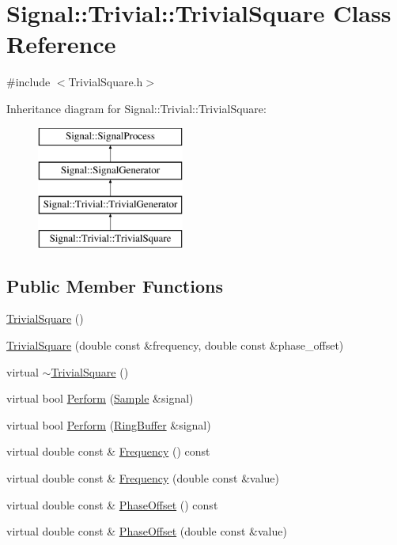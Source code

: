\hypertarget{classSignal_1_1Trivial_1_1TrivialSquare}{\section{Signal\+:\+:Trivial\+:\+:Trivial\+Square Class Reference}
\label{classSignal_1_1Trivial_1_1TrivialSquare}
}


{\ttfamily \#include $<$Trivial\+Square.\+h$>$}

Inheritance diagram for Signal\+:\+:Trivial\+:\+:Trivial\+Square\+:\begin{figure}[H]
\begin{center}
\leavevmode
\includegraphics[height=4.000000cm]{classSignal_1_1Trivial_1_1TrivialSquare}
\end{center}
\end{figure}
\subsection*{Public Member Functions}
\begin{DoxyCompactItemize}
\item 
\hyperlink{classSignal_1_1Trivial_1_1TrivialSquare_a4b5265f3667bc9471a5b24ee4bf04c51}{Trivial\+Square} ()
\item 
\hyperlink{classSignal_1_1Trivial_1_1TrivialSquare_a285797094f835304fd5c7a0ba744925d}{Trivial\+Square} (double const \&frequency, double const \&phase\+\_\+offset)
\item 
virtual \hyperlink{classSignal_1_1Trivial_1_1TrivialSquare_a909c1e7e3085b897b0546dbc05a4591c}{$\sim$\+Trivial\+Square} ()
\item 
virtual bool \hyperlink{classSignal_1_1Trivial_1_1TrivialSquare_a96464d74ed0a059537a51219bea86e28}{Perform} (\hyperlink{classSignal_1_1Sample}{Sample} \&signal)
\item 
virtual bool \hyperlink{classSignal_1_1Trivial_1_1TrivialSquare_af91046f5e58d3e6a8aa4dac5023658ef}{Perform} (\hyperlink{classSignal_1_1RingBuffer}{Ring\+Buffer} \&signal)
\item 
virtual double const \& \hyperlink{classSignal_1_1SignalGenerator_a96af42ee68f94e9b04d034fd68b73ecd}{Frequency} () const 
\item 
virtual double const \& \hyperlink{classSignal_1_1SignalGenerator_af83b532bf3ddc3637c2fd7a1dfd095cb}{Frequency} (double const \&value)
\item 
virtual double const \& \hyperlink{classSignal_1_1SignalGenerator_ac2538ec946f001e394d2416fda698d1c}{Phase\+Offset} () const 
\item 
virtual double const \& \hyperlink{classSignal_1_1SignalGenerator_ac6a103ff72beaa338f6d18c812522d78}{Phase\+Offset} (double const \&value)
\end{DoxyCompactItemize}
